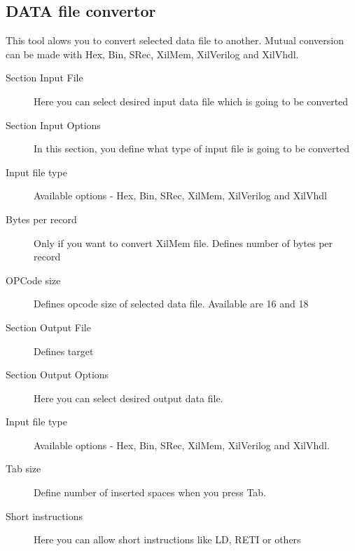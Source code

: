 \subsection{DATA file convertor}
    This tool alows you to convert selected data file to another. Mutual conversion can be made with
    Hex, Bin, SRec, XilMem, XilVerilog and XilVhdl.
    \begin{description}
        \item[Section Input File] Here you can select desired input data file which is going to be converted
        \item[Section Input Options] In this section, you define what type of input file is going to be converted
        \item[Input file type] Available options - Hex, Bin, SRec, XilMem, XilVerilog and XilVhdl
        \item[Bytes per record] Only if you want to convert XilMem file. Defines number of bytes per record
        \item[OPCode size] Defines opcode size of selected data file. Available are 16 and 18
        \item[Section Output File] Defines target
        \item[Section Output Options] Here you can select desired output data file.
        \item[Input file type] Available options - Hex, Bin, SRec, XilMem, XilVerilog and XilVhdl.
        \item[Tab size]  Define number of inserted spaces when you press Tab.
        \item[Short instructions] Here you can allow short instructions like LD, RETI or others
    \end{description}

